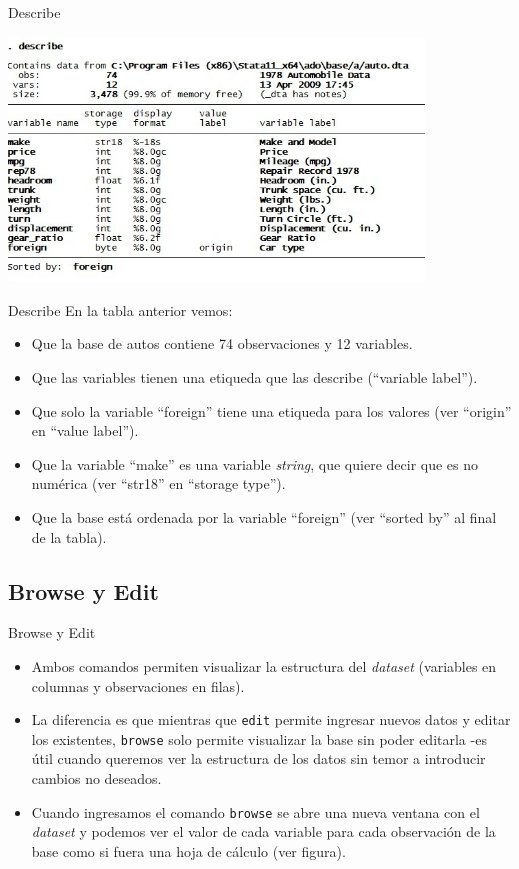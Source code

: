 \documentclass{beamer}
\begin{document}
\begin{frame}{Describe}
\centerline{\includegraphics[height=6.5cm]{Describe1.jpg}}
\end{frame}


\begin{frame}{Describe}
En la tabla anterior vemos:
\begin{itemize}
\item Que la base de autos contiene 74 observaciones y 12 variables.
\item Que las variables tienen una etiqueda que las describe (``variable label'').
\item Que solo la variable ``foreign'' tiene una etiqueda para los valores (ver ``origin'' en ``value label'').
\item Que la variable ``make'' es una variable \textit{string}, que quiere decir que es no numérica (ver ``str18'' en ``storage type''). 
\item Que la base está ordenada por la variable ``foreign'' (ver ``sorted by'' al final de la tabla).
\end{itemize}
\end{frame}

\subsection{Browse y Edit}
\begin{frame}{Browse y Edit}
\begin{itemize}
\item Ambos comandos permiten visualizar la estructura del \textit{dataset} (variables en columnas y observaciones en filas).
\item La diferencia es que mientras que \texttt{edit} permite ingresar nuevos datos y editar los existentes, \texttt{browse} solo permite visualizar la base sin poder editarla -es útil cuando queremos ver la estructura de los datos sin temor a introducir cambios no deseados.
\item Cuando ingresamos el comando \texttt{browse} se abre una nueva ventana con el \textit{dataset} y podemos ver el valor de cada variable para cada observación de la base como si fuera una hoja de cálculo (ver figura).
\end{itemize}
\end{frame} 
\end{document}
